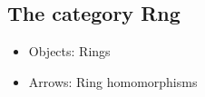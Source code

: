 \subsection{The category Rng}
\begin{itemize}
  \item Objects: Rings
  \item Arrows: Ring homomorphisms
\end{itemize}